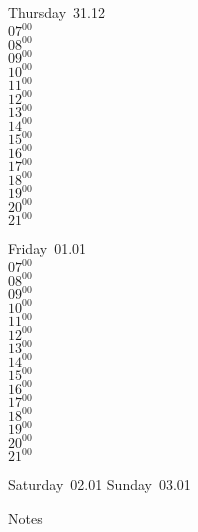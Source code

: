 \documentclass[11pt,a4paper]{book}\usepackage[]{graphicx}\usepackage[]{color}
\begin{document}
\clearpage
\begin{headerbox}
\end{headerbox}
\begin{weekdaybox}
  Thursday~31.12\\
  { 
  \vfill
  $07^{00}$\\
$08^{00}$\\
$09^{00}$\\
$10^{00}$\\
$11^{00}$\\
$12^{00}$\\
$13^{00}$\\
$14^{00}$\\
$15^{00}$\\
$16^{00}$\\
$17^{00}$\\
$18^{00}$\\
$19^{00}$\\
$20^{00}$\\
$21^{00}$\\
  }
\end{weekdaybox} 
\begin{weekdaybox}
  Friday~01.01\\
  { 
  \vfill
  $07^{00}$\\
$08^{00}$\\
$09^{00}$\\
$10^{00}$\\
$11^{00}$\\
$12^{00}$\\
$13^{00}$\\
$14^{00}$\\
$15^{00}$\\
$16^{00}$\\
$17^{00}$\\
$18^{00}$\\
$19^{00}$\\
$20^{00}$\\
$21^{00}$\\
  }
\end{weekdaybox}
\begin{weekendbox}
  Saturday~02.01
  \tcblower
  Sunday~03.01
\end{weekendbox} %
\begin{notebox}
  Notes
\end{notebox}
\clearpage
\end{document}
